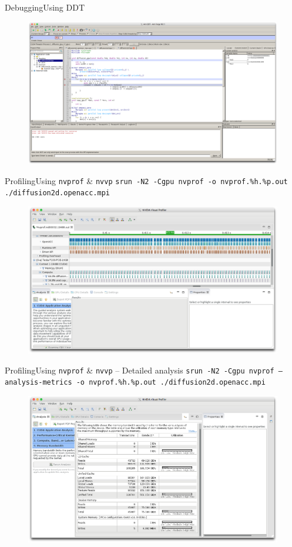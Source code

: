 \documentclass[aspectratio=169,12pt]{beamer}
\begin{document}
\begin{frame}{Debugging}{Using DDT}
  \begin{figure}
    \includegraphics[width=\textwidth]{ddt.png}
  \end{figure}
\end{frame}

\begin{frame}{Profiling}{Using \texttt{nvprof} \& \texttt{nvvp}}
  \texttt{srun -N2 -Cgpu nvprof -o nvprof.\%h.\%p.out ./diffusion2d.openacc.mpi}
  \begin{figure}
    \includegraphics[width=.8\textwidth]{nvvp_timeline}
  \end{figure}
\end{frame}

\begin{frame}{Profiling}{Using \texttt{nvprof} \& \texttt{nvvp} -- Detailed analysis}
  \texttt{srun -N2 -Cgpu nvprof --analysis-metrics -o nvprof.\%h.\%p.out ./diffusion2d.openacc.mpi}
  \begin{figure}
    \includegraphics[width=.8\textwidth]{nvvp_membw}
  \end{figure}
\end{frame}
\end{document}
